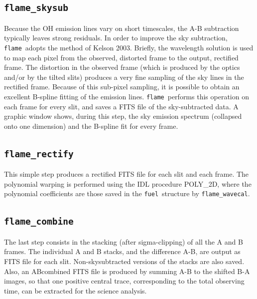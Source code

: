 \documentclass[a4paper, notitlepage]{article}
\newcommand{\flame}{\texttt{flame}}
\newcommand{\fuel}{\texttt{fuel}}
\begin{document}
\subsection{\texttt{flame\_skysub}}

Because the OH emission lines vary on short timescales, the A-B subtraction typically leaves strong residuals. In order to improve the sky subtraction, \flame\ adopts the method of Kelson 2003. Briefly, the wavelength solution is used to map each pixel from the observed, distorted frame to the output, rectified frame. The distortion in the observed frame (which is produced by the optics and/or by the tilted slits) produces a very fine sampling of the sky lines in the rectified frame. Because of this sub-pixel sampling, it is possible to obtain an excellent B-spline fitting of the emission lines. \flame\ performs this operation on each frame for every slit, and saves a FITS file of the sky-subtracted data. A graphic window shows, during this step, the sky emission spectrum (collapsed onto one dimension) and the B-spline fit for every frame.


\subsection{\texttt{flame\_rectify}}

This simple step produces a rectified FITS file for each slit and each frame. The polynomial warping is performed using the IDL procedure POLY\_2D, where the polynomial coefficients are those saved in the \fuel\ structure by \texttt{flame\_wavecal}.



\subsection{\texttt{flame\_combine}}

The last step consists in the stacking (after sigma-clipping) of all the A and B frames. The individual A and B stacks, and the difference A-B, are output as FITS file for each slit. Non-skysubtracted versions of the stacks are also saved. Also, an ABcombined FITS file is produced by summing A-B to the shifted B-A images, so that one positive central trace, corresponding to the total observing time, can be extracted for the science analysis.
\end{document}
